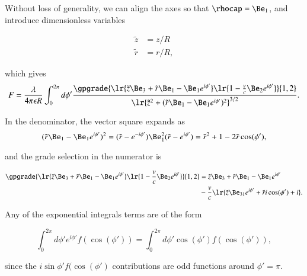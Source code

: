 Without loss of generality, we can align the axes so that \( \rhocap = \Be_1 \), and
introduce dimensionless variables

\begin{dmath}\label{eqn:ringField:100}
\begin{aligned}
\tilde{z} &= z/R \\
\tilde{r} &= r/R,
\end{aligned}
\end{dmath}

which gives
\begin{dmath}\label{eqn:ringField:120}
F
= \frac{\lambda}{4 \pi \epsilon R} \int_0^{2\pi} d\phi' \frac{\gpgrade{ \lr{ \tilde{z} \Be_3 + \tilde{r} \Be_1 - \Be_1 e^{i\phi'} } \lr{ 1 - \frac{v}{c} \Be_2 e^{i\phi'} } }{1,2} } { \lr{ \tilde{z}^2 + (\tilde{r} \Be_1 - \Be_1 e^{i\phi'})^2}^{3/2} }.
\end{dmath}

In the denominator, the vector square expands as
\begin{dmath}\label{eqn:ringField:140}
(\tilde{r} \Be_1 - \Be_1 e^{i\phi'})^2
=
(\tilde{r} - e^{-i\phi'}) \Be_1^2 (\tilde{r} - e^{i\phi'})
=
\tilde{r}^2 + 1 - 2 \tilde{r} \cos(\phi'),
\end{dmath}

and the grade selection in the numerator is

\begin{dmath}\label{eqn:ringField:160}
\begin{aligned}
\gpgrade{ \lr{ \tilde{z} \Be_3 + \tilde{r} \Be_1 - \Be_1 e^{i\phi'} } \lr{ 1 - \frac{v}{c} \Be_2 e^{i\phi'}}}{1,2}
&=
\tilde{z} \Be_3 + \tilde{r} \Be_1 - \Be_1 e^{i\phi'} \\
&-\frac{v}{c}\lr{ \tilde{z} \Be_{31} e^{i\phi'} + \tilde{r} i \cos(\phi') + i }.
\end{aligned}
\end{dmath}

Any of the exponential integrals terms
are of the form

\begin{dmath}\label{eqn:ringField:180}
\int_0^{2\pi} d\phi' e^{i\phi'} f(\cos(\phi')) = \int_0^{2\pi} d\phi' \cos(\phi') f(\cos(\phi')),
\end{dmath}

since
the \( i \sin\phi' f(\cos(\phi') \) contributions are odd functions around \( \phi' = \pi \).

